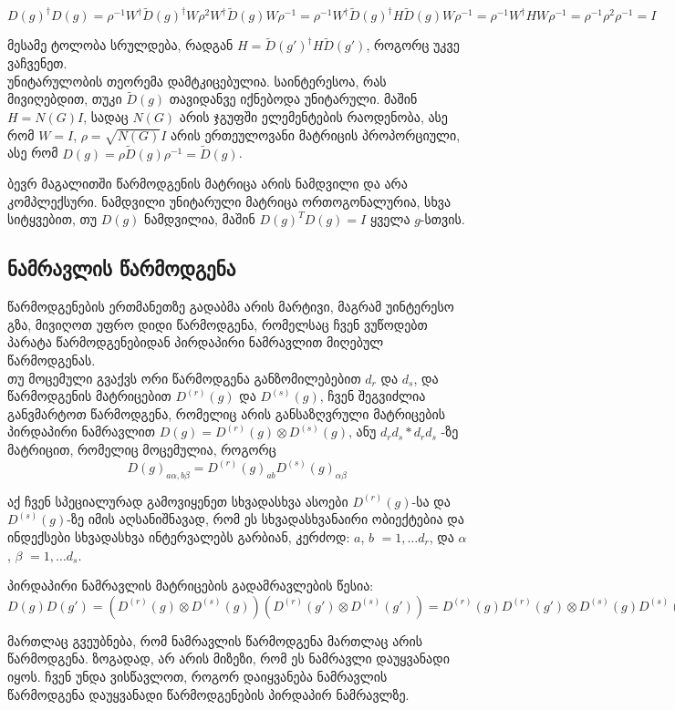 \documentclass[12pt]{article}
\begin{document}
\begin{sloppypar}
$
 D(g)^{\dagger}D(g) = 
 \rho^{-1} W^{\dagger} \widetilde D(g)^{\dagger} W \rho^2 
 W^{\dagger} \widetilde D(g) W \rho^{-1} = 
 \rho^{-1} W^{\dagger} \widetilde D(g)^{\dagger} H \widetilde D(g) W \rho^{-1} = 
 \rho^{-1} W^{\dagger} H W \rho^{-1} = 
 \rho^{-1} \rho^{2} \rho^{-1} = 
 I
$

მესამე ტოლობა სრულდება, რადგან $H = \widetilde D(g')^{\dagger} H \widetilde D(g')$, როგორც უკვე ვაჩვენეთ. \\

უნიტარულობის თეორემა დამტკიცებულია. საინტერესოა, რას მივიღებდით, თუკი $\widetilde D(g)$ თავიდანვე იქნებოდა უნიტარული. მაშინ $H = N(G)I$, სადაც $N(G)$ არის ჯგუფში ელემენტების რაოდენობა, ასე რომ $W = I$, $\rho = \sqrt{N(G)}I$ არის ერთეულოვანი მატრიცის პროპორციული, ასე რომ $D(g) = \rho \widetilde D(g) \rho^{-1} = \widetilde D(g)$.

ბევრ მაგალითში წარმოდგენის მატრიცა არის ნამდვილი და არა კომპლექსური. ნამდვილი უნიტარული მატრიცა ორთოგონალურია, სხვა სიტყვებით, თუ $D(g)$ ნამდვილია, მაშინ $D(g)^TD(g) = I$ ყველა $g$-სთვის.

\subsection{ნამრავლის წარმოდგენა}
წარმოდგენების ერთმანეთზე გადაბმა არის მარტივი, მაგრამ უინტერესო გზა, მივიღოთ უფრო დიდი წარმოდგენა, რომელსაც ჩვენ ვუწოდებთ პარატა წარმოდგენებიდან პირდაპირი ნამრავლით მიღებულ წარმოდგენას.\\

თუ მოცემული გვაქვს ორი წარმოდგენა განზომილებებით $d_r$ და $d_s$, და წარმოდგენის მატრიცებით $D^{(r)}(g)$ და $D^{(s)}(g)$, ჩვენ შეგვიძლია განვმარტოთ წარმოდგენა, რომელიც არის განსაზღვრული მატრიცების პირდაპირი ნამრავლით $D(g) = D^{(r)}(g) \otimes D^{(s)}(g)$, ანუ $d_{r}d_{s} * d_{r}d_{s}$ -ზე მატრიცით, რომელიც მოცემულია, როგორც
$$D(g)_{a\alpha,b\beta} = D^{(r)}(g)_{ab} D^{(s)}(g)_{\alpha\beta}$$

აქ ჩვენ სპეციალურად გამოვიყენეთ სხვადასხვა ასოები $D^{(r)}(g)$-სა და $D^{(s)}(g)$-ზე იმის აღსანიშნავად, რომ ეს სხვადასხვანაირი ობიექტებია და ინდექსები სხვადასხვა ინტერვალებს გარბიან, კერძოდ: $a$, $b$ $=1,\dots d_r$, და $\alpha$, $\beta$ $=1,\dots d_s$.

პირდაპირი ნამრავლის მატრიცების გადამრავლების წესია: \\
$
 D(g)D(g') = (D^{(r)}(g) \otimes D^{(s)}(g))(D^{(r)}(g') \otimes D^{(s)}(g')) =
 D^{(r)}(g)D^{(r)}(g') \otimes D^{(s)}(g)D^{(s)}(g') = D(gg')
$

მართლაც გვეუბნება, რომ ნამრავლის წარმოდგენა მართლაც არის წარმოდგენა. ზოგადად, არ არის მიზეზი, რომ ეს ნამრავლი დაუყვანადი იყოს. ჩვენ უნდა ვისწავლოთ, როგორ დაიყვანება ნამრავლის წარმოდგენა დაუყვანადი წარმოდგენების პირდაპირ ნამრავლზე.\\


\end{sloppypar}
\end{document}
